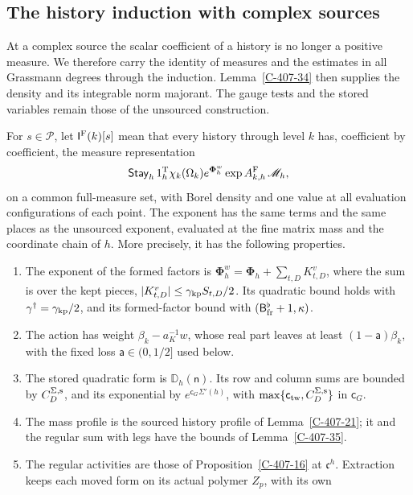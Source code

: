 \documentclass[11pt,letterpaper,reqno]{amsart}
\makeatletter
\theoremstyle{definition}
\newcommand{\ms@minorstart}{%
  \pushQED{\qed}\renewcommand{\qedsymbol}{$\blacksquare$}}
\newenvironment{definition}[1][]{\ms@minorstart\ms@definition[#1]}
  {\popQED\endms@definition}
\theoremstyle{remark}
\makeatother
\begin{document}
\subsection{The history induction with complex sources}

At a complex source the scalar coefficient of a history is no
longer a positive measure. We therefore carry the identity of
measures and the estimates in all Grassmann degrees through the
induction. Lemma~\ref{C-407-34} then supplies the density and its
integrable norm majorant. The gauge tests and the stored variables
remain those of the unsourced construction.

\begin{definition}[The sourced inductive statement]\label{C-407-36}
For $s\in\mathcal P$, let $\mathsf I^{\rm F}(k)[s]$ mean that every
history through level $k$ has, coefficient by coefficient, the
measure representation
\[
 \mathsf{Stay}_h\,1_h^{\rm T}\chi_k(\Omega_k)
       e^{\boldsymbol\Phi_h^w}\exp A^{\rm F}_{k,h}\,\mathscr M_h,
\]
on a common full-measure set, with Borel density and one value at
all evaluation configurations of each point. The exponent has the
same terms and the same places as the unsourced exponent, evaluated
at the fine matrix mass and the coordinate chain of $h$. More
precisely, it has the following properties.
\begin{enumerate}
\item The exponent of the formed factors is
$\boldsymbol\Phi_h^w=\boldsymbol\Phi_h+\sum_{t,D}K^v_{t,D}$,
where the sum is over the kept pieces,
$|K^v_{t,D}|\le\gamma_{\rm kp}S_{t,D}/2$. Its quadratic bound
holds with $\gamma^\dagger=\gamma_{\rm kp}/2$, and its
formed-factor bound with $(\mathsf B_{\rm fr}^\flat+1,\kappa)$.
\item The action has weight $\beta_k-a_K^{-1}w$, whose real
part leaves at least $(1-\mathsf a)\beta_k$, with the fixed
loss $\mathsf a\in(0,1/2]$ used below.
\item The stored quadratic form is $\mathbb D_h(\mathsf n)$.
Its row and column sums are bounded by $C_D^{\Sigma,\rm s}$,
and its exponential by $e^{\mathsf c_G\Sigma'(h)}$, with
$\max\{\mathsf c_{\rm tw},C_D^{\Sigma,\rm s}\}$ in
$\mathsf c_G$.
\item The mass profile is the sourced history profile of
Lemma~\ref{C-407-21}; it and the regular sum with legs have the
bounds of Lemma~\ref{C-407-35}.
\item The regular activities are those of
Proposition~\ref{C-407-16} at $\mathfrak c^h$. Extraction keeps
each moved form on its actual polymer $Z_p$, with its own

\end{enumerate}
\end{definition}
\end{document}
